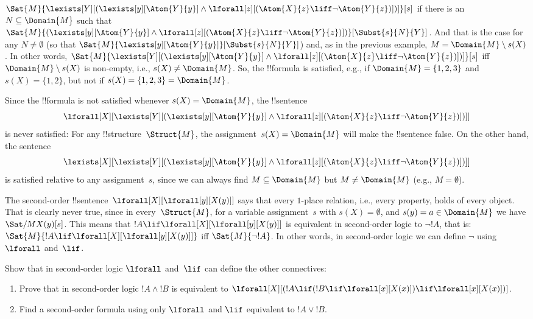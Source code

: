 \documentclass[../../../include/open-logic-section]{subfiles}
\begin{document}
\begin{ex}
  $\Sat{M}{\lexists[Y][(\lexists[y][\Atom{Y}{y}] \land
  \lforall[z][(\Atom{X}{z} \liff \lnot \Atom{Y}{z})])]}[s]$ if there
  is an $N \subseteq \Domain{M}$ such that
  $\Sat{M}{(\lexists[y][\Atom{Y}{y}] \land \lforall[z][(\Atom{X}{z}
  \liff \lnot \Atom{Y}{z})])}[\Subst{s}{N}{Y}]$. And that is the case
  for any $N \neq \emptyset$ (so that
  $\Sat{M}{\lexists[y][\Atom{Y}{y}]}[\Subst{s}{N}{Y}]$) and, as in the
  previous example, $M = \Domain{M} \setminus s(X)$. In other words,
  $\Sat{M}{\lexists[Y][(\lexists[y][\Atom{Y}{y}] \land
  \lforall[z][(\Atom{X}{z} \liff \lnot \Atom{Y}{z})])]}[s]$ iff
  $\Domain{M} \setminus s(X)$ is non-empty, i.e., $s(X) \neq
  \Domain{M}$. So, the !!{formula} is satisfied, e.g., if $\Domain{M}
  = \{1, 2, 3\}$ and $s(X) = \{1, 2\}$, but not if $s(X) = \{1, 2, 3\}
  = \Domain{M}$.

  Since the !!{formula} is not satisfied whenever $s(X) = \Domain{M}$,
  the !!{sentence}
  \[
  \lforall[X][\lexists[Y][(\lexists[y][\Atom{Y}{y}] \land
      \lforall[z][(\Atom{X}{z} \liff \lnot \Atom{Y}{z})])]]
  \]
  is never satisfied: For any !!{structure}~$\Struct{M}$, the
  assignment~$s(X) = \Domain{M}$ will make the !!{sentence} false. On
  the other hand, the sentence
  \[
  \lexists[X][\lexists[Y][(\lexists[y][\Atom{Y}{y}] \land
      \lforall[z][(\Atom{X}{z} \liff \lnot \Atom{Y}{z})])]]
  \]
  is satisfied relative to any assignment~$s$, since we can always
  find $M \subseteq \Domain{M}$ but $M \neq \Domain{M}$ (e.g., $M = \emptyset$).
\end{ex}

\begin{ex}
  The second-order !!{sentence}~$\lforall[X][\lforall[y][X(y)]]$ says
  that every $1$-place relation, i.e., every property, holds of every
  object. That is clearly never true, since in every~$\Struct{M}$, for
  a variable assignment~$s$ with $s(X) = \emptyset$, and $s(y) = a \in
  \Domain{M}$ we have $\Sat/{M}{X(y)}[s]$. This means that $!A \lif
  \lforall[X][\lforall[y][X(y)]]$ is equivalent in second-order logic
  to $\lnot !A$, that is: $\Sat{M}{!A \lif
  \lforall[X][\lforall[y][X(y)]]}$ iff $\Sat{M}{\lnot !A}$. In other
  words, in second-order logic we can define $\lnot$ using $\lforall$
  and~$\lif$.
\end{ex}

\begin{prob}
  Show that in second-order logic $\lforall$ and~$\lif$ can define the other
  connectives:
  \begin{enumerate}
    \item Prove that in second-order logic $!A \land !B$ is equivalent
    to $\lforall[X][(!A \lif (!B \lif \lforall[x][X(x)])\lif
    \lforall[x][X(x)])]$.
    \item Find a second-order formula using only $\lforall$ and $\lif$
    equivalent to $!A \lor !B$.
  \end{enumerate}
\end{prob}
\end{document}
